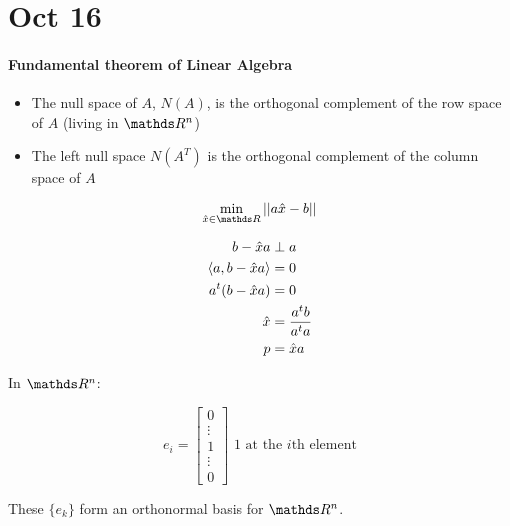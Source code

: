 \section{Oct 16}

\paragraph{Fundamental theorem of Linear Algebra}
\begin{itemize}
  \item The null space of $A$, $N(A)$, is the orthogonal complement of the row space of $A$ (living in $\bbR^n$)
  \item The left null space $N(A^T)$ is the orthogonal complement of the column space of $A$
\end{itemize}

\[
  \min_{\hat{x} \in \bbR} \norm{a \hat{x} - b}
\]

\begin{align*}
  b-\hat{x}a &\perp a \\
  \langle a,b-\hat{x}a\rangle &= 0\\
  a^t(b-\hat{x}a) &= 0\\
  \hat{x} &= {a^t b \over a^t a} \\
  p &= \hat{x} a
\end{align*}

In $\bbR^n$:

\[
  e_i = \begin{bmatrix}
    0 \\ \vdots \\ 1 \\ \vdots \\ 0
  \end{bmatrix} \text{ 1 at the } i\text{th element}
\]

These $\{e_k\}$ form an orthonormal basis for $\bbR^n$.

